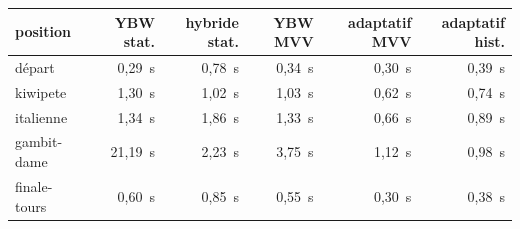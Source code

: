 \begin{tabular}{lrrrrr}
\toprule
position & YBW stat. & hybride stat. & YBW MVV & adaptatif MVV & adaptatif hist.\\
\midrule
départ & 0{,}29~s & 0{,}78~s & 0{,}34~s & 0{,}30~s & 0{,}39~s\\
kiwipete & 1{,}30~s & 1{,}02~s & 1{,}03~s & 0{,}62~s & 0{,}74~s\\
italienne & 1{,}34~s & 1{,}86~s & 1{,}33~s & 0{,}66~s & 0{,}89~s\\
gambit-dame & 21{,}19~s & 2{,}23~s & 3{,}75~s & 1{,}12~s & 0{,}98~s\\
finale-tours & 0{,}60~s & 0{,}85~s & 0{,}55~s & 0{,}30~s & 0{,}38~s\\
\bottomrule
\end{tabular}
